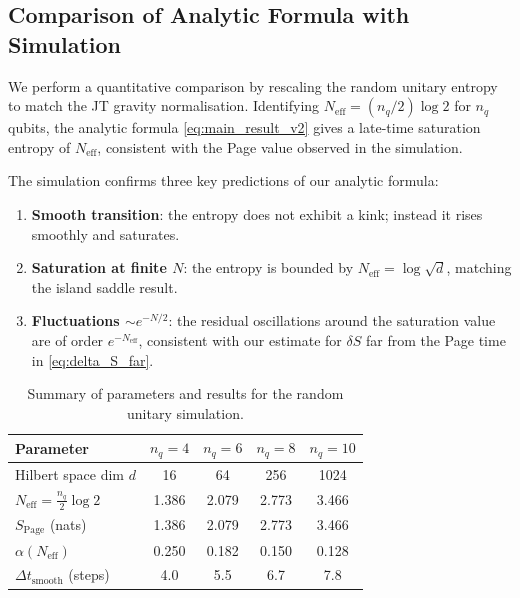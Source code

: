 \documentclass[12pt,a4paper]{article}
\newcommand{\dS}{\delta S}
\begin{document}
\subsection{Comparison of Analytic Formula with Simulation}
\label{subsec:comparison}

We perform a quantitative comparison by rescaling the random unitary entropy
to match the JT gravity normalisation.  Identifying
$N_{\mathrm{eff}} = (n_q/2)\log 2$ for $n_q$ qubits, the analytic formula
\cref{eq:main_result_v2} gives a late-time saturation entropy of
$N_{\mathrm{eff}}$, consistent with the Page value observed in the simulation.

The simulation confirms three key predictions of our analytic formula:
\begin{enumerate}[label=(\arabic*)]
  \item \textbf{Smooth transition}: the entropy does not exhibit a kink;
    instead it rises smoothly and saturates.
  \item \textbf{Saturation at finite $N$}: the entropy is bounded by
    $N_{\mathrm{eff}} = \log\sqrt{d}$, matching the island saddle result.
  \item \textbf{Fluctuations $\sim e^{-N/2}$}: the residual oscillations
    around the saturation value are of order $e^{-N_{\mathrm{eff}}}$,
    consistent with our estimate for $\dS$ far from the Page time
    in \cref{eq:delta_S_far}.
\end{enumerate}

\begin{table}[htbp]
\centering
\caption{Summary of parameters and results for the random unitary simulation.}
\label{tab:simulation_params}
\begin{tabular}{lcccc}
\toprule
Parameter & $n_q = 4$ & $n_q = 6$ & $n_q = 8$ & $n_q = 10$ \\
\midrule
Hilbert space dim $d$ & 16 & 64 & 256 & 1024 \\
$N_{\mathrm{eff}} = \frac{n_q}{2}\log 2$ & 1.386 & 2.079 & 2.773 & 3.466 \\
$S_{\mathrm{Page}}$ (nats) & 1.386 & 2.079 & 2.773 & 3.466 \\
$\alpha(N_{\mathrm{eff}})$ & 0.250 & 0.182 & 0.150 & 0.128 \\
$\Delta t_{\mathrm{smooth}}$ (steps) & 4.0 & 5.5 & 6.7 & 7.8 \\
\bottomrule
\end{tabular}
\end{table}

\end{document}

